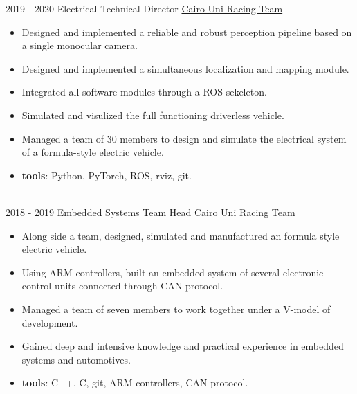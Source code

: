 \documentclass[letterpaper]{twentysecondcv} %
\begin{document}
\begin{twenty} %


\twentyitem
    	{2019 - 2020}
		{}
        {Electrical Technical Director}
        {\href{https://curt-fs.team//}{Cairo Uni Racing Team}}
        {}
        {\vspace{-2mm}\begin{itemize}[topsep=0pt,partopsep=0pt]
				\item Designed and implemented a reliable and robust perception pipeline based on a single monocular camera.
				\item Designed and implemented a simultaneous localization and mapping module.
				\item Integrated all software modules through a ROS sekeleton. 
				\item Simulated and visulized the full functioning driverless vehicle.
				\item Managed a team of 30 members to design and simulate the electrical system of a formula-style electric vehicle.
				\item \textbf{tools}: Python, PyTorch, ROS, rviz, git.
				\end{itemize}} \\
				
	\twentyitem
    	{2018 - 2019}
		{}
        {Embedded Systems Team Head}
        {\href{https://curt-fs.team//}{Cairo Uni Racing Team}}
        {}
        {\vspace{-2mm}\begin{itemize}[topsep=0pt,partopsep=0pt]
        \item Along side a team, designed, simulated and manufactured an formula style electric vehicle.
        \item Using ARM controllers, built an embedded system of several electronic control units connected through CAN protocol. 
        \item Managed a team of seven members to work together under a V-model of development.
        \item Gained deep and intensive knowledge and practical experience in embedded systems and automotives.
				\item \textbf{tools}: C++, C, git, ARM controllers, CAN protocol.
    \end{itemize}} \\
		

\end{twenty}
\end{document}
